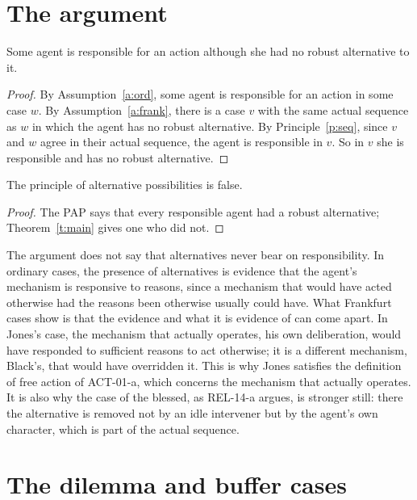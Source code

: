 \documentclass{situationist-preprint}
\begin{document}
\section{The argument}

\begin{theorem}\label{t:main}
Some agent is responsible for an action although she had no robust alternative to it.
\end{theorem}

\begin{proof}
By Assumption~\ref{a:ord}, some agent is responsible for an action in some case $w$. By Assumption~\ref{a:frank}, there is a case $v$ with the same actual sequence as $w$ in which the agent has no robust alternative. By Principle~\ref{p:seq}, since $v$ and $w$ agree in their actual sequence, the agent is responsible in $v$. So in $v$ she is responsible and has no robust alternative.
\end{proof}

\begin{corollary}\label{c:pap}
The principle of alternative possibilities is false.
\end{corollary}

\begin{proof}
The PAP says that every responsible agent had a robust alternative; Theorem~\ref{t:main} gives one who did not.
\end{proof}

The argument does not say that alternatives never bear on responsibility. In ordinary cases, the presence of alternatives is evidence that the agent's mechanism is responsive to reasons, since a mechanism that would have acted otherwise had the reasons been otherwise usually could have. What Frankfurt cases show is that the evidence and what it is evidence of can come apart. In Jones's case, the mechanism that actually operates, his own deliberation, would have responded to sufficient reasons to act otherwise; it is a different mechanism, Black's, that would have overridden it. This is why Jones satisfies the definition of free action of ACT-01-a, which concerns the mechanism that actually operates. It is also why the case of the blessed, as REL-14-a argues, is stronger still: there the alternative is removed not by an idle intervener but by the agent's own character, which is part of the actual sequence.

\section{The dilemma and buffer cases}\label{s:dilemma}
\end{document}
